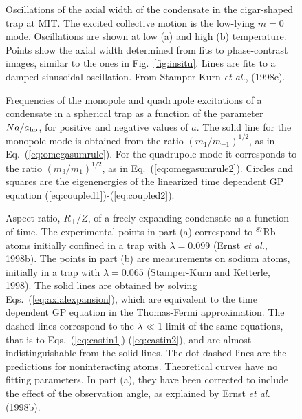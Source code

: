 \begin{figure}[t]
\epsfysize=8cm
\hspace{3cm}
\caption{Oscillations of the axial width of the condensate in the 
cigar-shaped trap at MIT. The excited collective motion is the 
low-lying $m=0$ mode. Oscillations are shown at low (a) and 
high (b) temperature. Points show the axial width determined from 
fits to phase-contrast images, similar to the ones in 
Fig.~\protect\ref{fig:insitu}. 
Lines are fits to a damped sinusoidal oscillation. From 
Stamper-Kurn {\it et al.}, (1998c).  } 
\label{fig:oscillationsMIT}
\end{figure}

\bigskip

\begin{figure}[t]
\epsfysize=8cm
\hspace{3cm}
\caption{Frequencies of the monopole and quadrupole excitations
of a condensate in a spherical trap as a function of the parameter
$Na/a_{\rm ho}$, for positive and negative values of $a$. 
The solid line for the monopole mode is obtained from 
the ratio $(m_1/m_{-1})^{1/2}$, as in  Eq.~(\protect\ref{eq:omegasumrule}). 
For the quadrupole mode it corresponds to the ratio $(m_3/m_1)^{1/2}$, as 
in Eq.~(\protect\ref{eq:omegasumrule2}). Circles and squares are the 
eigenenergies of the linearized time dependent GP equation 
(\protect\ref{eq:coupled1})-(\protect\ref{eq:coupled2}).  } 
\label{fig:sumrules}
\end{figure}

\bigskip

\begin{figure}[t]
\epsfysize=8cm
\hspace{3cm}
\caption{ Aspect ratio, $R_\perp /Z$, of a freely expanding condensate 
as a function of time. The experimental points in part (a) correspond to 
$^{87}$Rb atoms initially confined in a trap with $\lambda=0.099$ (Ernst 
{\it et al.}, 1998b). The points in part (b) are measurements on sodium 
atoms, initially in a trap with $\lambda=0.065$ (Stamper-Kurn and 
Ketterle, 1998). The solid lines are obtained by solving 
Eqs.~(\protect\ref{eq:axialexpansion}), which are equivalent to the time 
dependent GP equation in the Thomas-Fermi approximation. The dashed lines 
correspond to the $\lambda \ll 1$ limit of the same equations, that is 
to Eqs.~(\protect\ref{eq:castin1})-(\protect\ref{eq:castin2}), and are almost
indistinguishable from the solid lines. The dot-dashed lines are the 
predictions for noninteracting atoms. Theoretical curves have no fitting 
parameters. In part (a), they have been corrected to include the effect 
of the observation angle, as explained by Ernst {\it et al.} (1998b).   }
\label{fig:expansion}
\end{figure}

